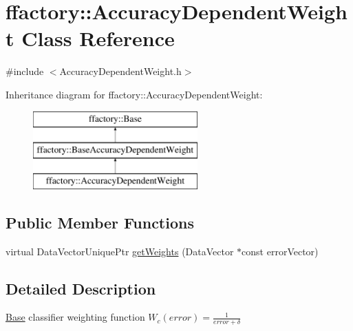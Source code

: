 \hypertarget{classffactory_1_1_accuracy_dependent_weight}{\section{ffactory\-:\-:Accuracy\-Dependent\-Weight Class Reference}
\label{classffactory_1_1_accuracy_dependent_weight}
}


{\ttfamily \#include $<$Accuracy\-Dependent\-Weight.\-h$>$}

Inheritance diagram for ffactory\-:\-:Accuracy\-Dependent\-Weight\-:\begin{figure}[H]
\begin{center}
\leavevmode
\includegraphics[height=3.000000cm]{classffactory_1_1_accuracy_dependent_weight}
\end{center}
\end{figure}
\subsection*{Public Member Functions}
\begin{DoxyCompactItemize}
\item 
virtual Data\-Vector\-Unique\-Ptr \hyperlink{classffactory_1_1_accuracy_dependent_weight_a7b912fc0846d557aea10d933501daade}{get\-Weights} (Data\-Vector $\ast$const error\-Vector)
\end{DoxyCompactItemize}


\subsection{Detailed Description}
\hyperlink{classffactory_1_1_base}{Base} classifier weighting function $ W_c(error) = \frac{1}{error+\delta} $ 

